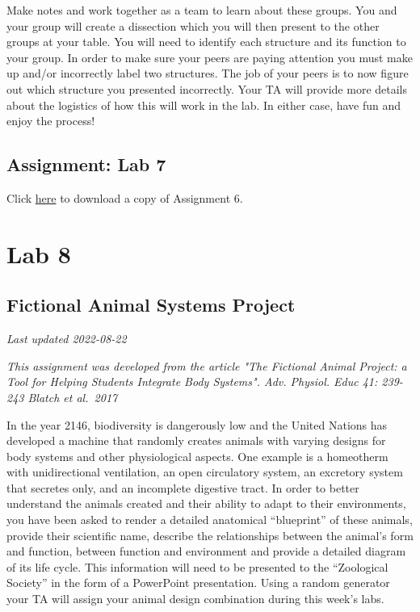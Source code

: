 \documentclass[
]{book}
\begin{document}
Make notes and work together as a team to learn about these groups. You and your group will create a dissection which you will then present to the other groups at your table. You will need to identify each structure and its function to your group. In order to make sure your peers are paying attention you must make up and/or incorrectly label two structures. The job of your peers is to now figure out which structure you presented incorrectly. Your TA will provide more details about the logistics of how this will work in the lab. In either case, have fun and enjoy the process!

\hypertarget{assignment-lab-7}{%
\chapter*{Assignment: Lab 7}\label{assignment-lab-7}}

Click \href{https://osf.io/download/ze6ct}{here} to download a copy of Assignment 6.

\hypertarget{part-lab-8}{%
\part*{Lab 8}\label{part-lab-8}}

\hypertarget{fictional-animal-systems-project}{%
\chapter*{Fictional Animal Systems Project}\label{fictional-animal-systems-project}}

\emph{Last updated 2022-08-22}

\emph{This assignment was developed from the article "The Fictional Animal Project: a Tool for Helping Students Integrate Body Systems". Adv. Physiol. Educ 41: 239-243 Blatch et al.~2017}

In the year 2146, biodiversity is dangerously low and the United Nations has developed a machine that randomly creates animals with varying designs for body systems and other physiological aspects. One example is a homeotherm with unidirectional ventilation, an open circulatory system, an excretory system that secretes only, and an incomplete digestive tract. In order to better understand the animals created and their ability to adapt to their environments, you have been asked to render a detailed anatomical ``blueprint'' of these animals, provide their scientific name, describe the relationships between the animal's form and function, between function and environment and provide a detailed diagram of its life cycle. This information will need to be presented to the ``Zoological Society'' in the form of a PowerPoint presentation. Using a random generator your TA will assign your animal design combination during this week's labs.
\end{document}
